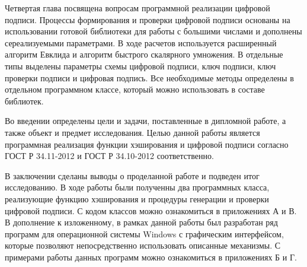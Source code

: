 \par
Четвертая глава посвящена  вопросам программной реализации цифровой подписи. Процессы формирования и проверки цифровой подписи основаны на использовании готовой библиотеки для работы с большими числами и дополнены сереализуемыми параметрами. В ходе расчетов используется расширенный алгоритм Евклида и алгоритм быстрого скалярного умножения. В отдельные типы выделены параметры схемы цифровой подписи, ключ подписи, ключ проверки подписи и цифровая подпись. Все необходимые методы определены в отдельном программном классе, который можно использовать в составе библиотек.
\par
Во введении определены цели и задачи, поставленные в дипломной работе, а также объект и предмет исследования. Целью данной работы является программная реализация функции хэширования и цифровой подписи согласно ГОСТ Р 34.11-2012 и ГОСТ Р 34.10-2012 соответственно.
\par
В заключении сделаны выводы о проделанной работе и подведен итог исследованию. В ходе работы были полученны два программных класса, реализующие функцию хэширования и процедуры генерации и проверки цифровой подписи. С кодом классов можно ознакомиться в приложениях А и В. В дополнение к изложенному, в рамках данной работы был разработан ряд программ для операционной системы Windows с графическим интерфейсом, которые позволяют непосредственно использовать описанные механизмы. С примерами работы данных программ можно ознакомиться в приложениях Б и Г.